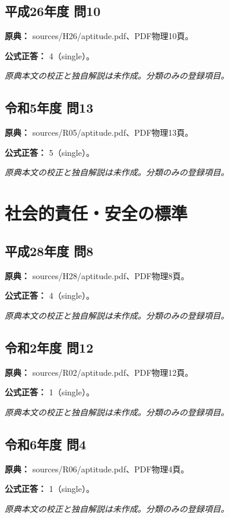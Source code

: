 \subsection{平成26年度 問10}
\label{q:h26-reg-apt-10}

\noindent\textbf{原典：} sources/H26/aptitude.pdf、PDF物理10頁。

\textbf{公式正答：} 4（single）。

\par\textit{原典本文の校正と独自解説は未作成。分類のみの登録項目。}

\subsection{令和5年度 問13}
\label{q:r05-reg-apt-13}

\noindent\textbf{原典：} sources/R05/aptitude.pdf、PDF物理13頁。

\textbf{公式正答：} 5（single）。

\par\textit{原典本文の校正と独自解説は未作成。分類のみの登録項目。}

\section{社会的責任・安全の標準}

\subsection{平成28年度 問8}
\label{q:h28-reg-apt-08}

\noindent\textbf{原典：} sources/H28/aptitude.pdf、PDF物理8頁。

\textbf{公式正答：} 4（single）。

\par\textit{原典本文の校正と独自解説は未作成。分類のみの登録項目。}

\subsection{令和2年度 問12}
\label{q:r02-reg-apt-12}

\noindent\textbf{原典：} sources/R02/aptitude.pdf、PDF物理12頁。

\textbf{公式正答：} 1（single）。

\par\textit{原典本文の校正と独自解説は未作成。分類のみの登録項目。}

\subsection{令和6年度 問4}
\label{q:r06-reg-apt-04}

\noindent\textbf{原典：} sources/R06/aptitude.pdf、PDF物理4頁。

\textbf{公式正答：} 1（single）。

\par\textit{原典本文の校正と独自解説は未作成。分類のみの登録項目。}
